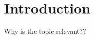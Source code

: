 \section{Introduction}

Why is the topic relevant??

\begin{comment}
* Untersuchungsgegenstand
* Erkenntnisinteresse
* Forschungsstand
* Ergebnisse können/sollen angedeuten werden
\end{comment}


